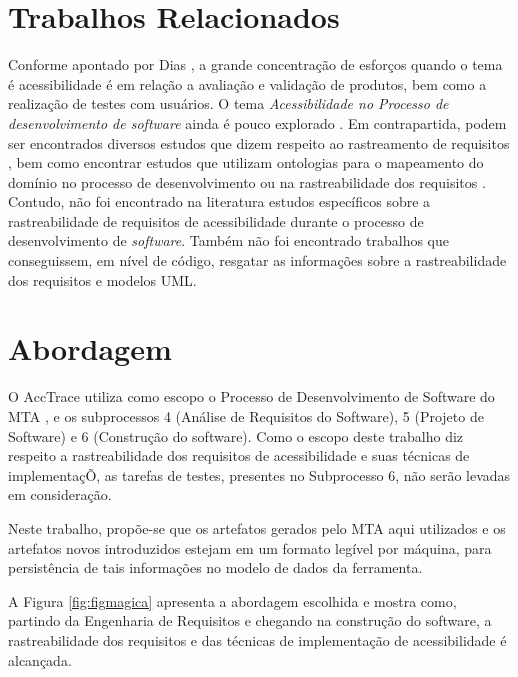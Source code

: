 \documentclass[runningheads,a4paper]{llncs}
\begin{document}
\section{Trabalhos Relacionados}

Conforme apontado por Dias \cite{analuizadias:2010}, a grande concentração de esforços quando o tema é acessibilidade é em relação a avaliação e validação de produtos, bem como a realização de testes com usuários. O tema \textit{Acessibilidade no Processo de desenvolvimento de software} ainda
é pouco explorado \cite{maia:10}. Em contrapartida, podem ser encontrados diversos
estudos que dizem respeito ao rastreamento de requisitos
\cite{5970169,292398,5485417,6405269}, bem como encontrar estudos que utilizam
ontologias para o mapeamento do domínio no processo de desenvolvimento ou na
rastreabilidade dos requisitos \cite{5223183,6511842,4148940,5362244}. Contudo,
não foi encontrado na literatura estudos específicos sobre a rastreabilidade de
requisitos de acessibilidade durante o processo de desenvolvimento de \textit{software}. Também não foi encontrado trabalhos que conseguissem,
em nível de código, resgatar as informações sobre a rastreabilidade dos requisitos e modelos UML.

\section{Abordagem}

O AccTrace utiliza como escopo o Processo de Desenvolvimento de Software do MTA
\cite{maia:10}, e os subprocessos 4 (Análise de Requisitos do Software), 5
(Projeto de Software) e 6 (Construção do software). Como o escopo deste trabalho
diz respeito a rastreabilidade dos requisitos de acessibilidade e suas técnicas
de implementaçÕ, as tarefas de testes, presentes no Subprocesso 6, não serão
levadas em consideração. 

Neste trabalho, propõe-se que os artefatos gerados pelo MTA aqui utilizados e os
artefatos novos introduzidos estejam em um formato legível por máquina, para
persistência de tais informações no modelo de dados da ferramenta.

A Figura \ref{fig:figmagica} apresenta a abordagem escolhida e mostra como,
partindo da Engenharia de Requisitos e chegando na construção do software,
a rastreabilidade dos requisitos e das técnicas de implementação de
acessibilidade é alcançada.
\end{document}
